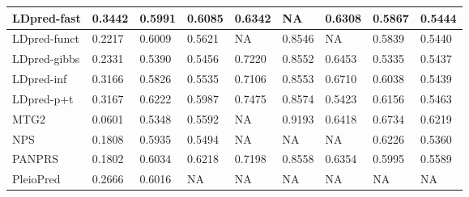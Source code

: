 \documentclass[pdflatex,sn-basic]{sn-jnl}
\begin{document}
\begin{table}[!ht]
{\begin{tabular}{|l|l|l|l|l|l|l|l|l|}
\hline
LDpred-fast \cite{Reales_2021} & \cellcolor[HTML]{6DC17C}0.3442 & \cellcolor[HTML]{C2DA81}0.5991 & \cellcolor[HTML]{CBDC81}0.6085 & \cellcolor[HTML]{F8696B}0.6342 & NA& \cellcolor[HTML]{BDD881}0.6308 & \cellcolor[HTML]{FDCB7D}0.5867 & \cellcolor[HTML]{FFEB84}0.5444 \\
\hline
LDpred-funct \cite{M_rquez_Luna_2021} & \cellcolor[HTML]{F0E784}0.2217 & \cellcolor[HTML]{BCD881}0.6009 & \cellcolor[HTML]{FDCB7D}0.5621 & NA& \cellcolor[HTML]{FEE883}0.8546 & NA& \cellcolor[HTML]{FDC67C}0.5839 & \cellcolor[HTML]{FFEB84}0.5440 \\
\hline
LDpred-gibbs \cite{Reales_2021} & \cellcolor[HTML]{E3E383}0.2331 & \cellcolor[HTML]{FCB679}0.5390 & \cellcolor[HTML]{FBAE78}0.5456 & \cellcolor[HTML]{CDDD82}0.7220 & \cellcolor[HTML]{FEE983}0.8552 & \cellcolor[HTML]{9DCF7F}0.6453 & \cellcolor[HTML]{F8696B}0.5335 & \cellcolor[HTML]{FEE983}0.5437 \\
\hline
LDpred-inf \cite{Reales_2021} & \cellcolor[HTML]{8ACA7E}0.3166 & \cellcolor[HTML]{F5E984}0.5826 & \cellcolor[HTML]{FCBC7A}0.5535 & \cellcolor[HTML]{F4E884}0.7106 & \cellcolor[HTML]{FEE983}0.8553 & \cellcolor[HTML]{63BE7B}0.6710 & \cellcolor[HTML]{FFEB84}0.6038 & \cellcolor[HTML]{FEEA83}0.5439 \\
\hline
LDpred-p+t \cite{Reales_2021} & \cellcolor[HTML]{8ACA7E}0.3167 & \cellcolor[HTML]{7AC57D}0.6222 & \cellcolor[HTML]{DDE283}0.5987 & \cellcolor[HTML]{76C47D}0.7475 & \cellcolor[HTML]{FEEA83}0.8574 & \cellcolor[HTML]{F8696B}0.5423 & \cellcolor[HTML]{E7E483}0.6156 & \cellcolor[HTML]{FBEA84}0.5463 \\
\hline
MTG2 \cite{Lee_2016} & \cellcolor[HTML]{FA9272}0.0601 & \cellcolor[HTML]{FBB078}0.5348 & \cellcolor[HTML]{FDC67C}0.5592 & NA& \cellcolor[HTML]{7FC67D}0.9193 & \cellcolor[HTML]{A4D17F}0.6418 & \cellcolor[HTML]{6EC27C}0.6734 & \cellcolor[HTML]{71C27C}0.6219 \\
\hline
NPS \cite{Chun_2020} & \cellcolor[HTML]{FEDB80}0.1808 & \cellcolor[HTML]{D3DF82}0.5935 & \cellcolor[HTML]{FCB579}0.5494 & NA& NA& NA& \cellcolor[HTML]{D8E082}0.6226 & \cellcolor[HTML]{FCBB7A}0.5360 \\
\hline
PANPRS \cite{Chen_2020} & \cellcolor[HTML]{FEDA80}0.1802 & \cellcolor[HTML]{B5D680}0.6034 & \cellcolor[HTML]{B2D580}0.6218 & \cellcolor[HTML]{D5DF82}0.7198 & \cellcolor[HTML]{FEE983}0.8558 & \cellcolor[HTML]{B3D580}0.6354 & \cellcolor[HTML]{FEE382}0.5995 & \cellcolor[HTML]{E4E483}0.5589 \\
\hline
PleioPred \cite{Weissbrod_2022} & \cellcolor[HTML]{C0D981}0.2666 & \cellcolor[HTML]{BAD881}0.6016 & NA& NA& NA& NA& NA& NA\\

\end{tabular}}
\end{table}
\end{document}
